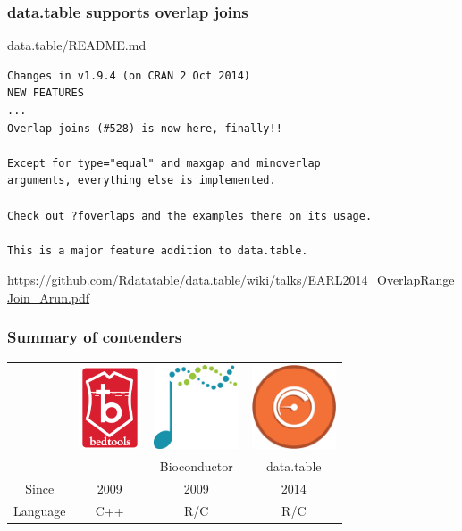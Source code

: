 \documentclass{beamer}
\begin{document}
\begin{frame}[fragile]
  \frametitle{data.table supports overlap joins}

data.table/README.md

\begin{verbatim}
Changes in v1.9.4 (on CRAN 2 Oct 2014)
NEW FEATURES
...
Overlap joins (#528) is now here, finally!! 

Except for type="equal" and maxgap and minoverlap 
arguments, everything else is implemented. 

Check out ?foverlaps and the examples there on its usage. 

This is a major feature addition to data.table.
\end{verbatim}

\alert{\url{https://github.com/Rdatatable/data.table/wiki/talks/EARL2014_OverlapRangeJoin_Arun.pdf}}

\end{frame}

\begin{frame}
  \frametitle{Summary of contenders}
  
  \begin{tabular}{cccc}
    &
    \includegraphics[height=2.5cm]{bedtools} &
    \includegraphics[height=2.5cm]{bioconductor} &
    \includegraphics[height=2.5cm]{datatable} \\
    &  & Bioconductor & data.table \\
    \hline
    Since & 2009 & 2009 & 2014 \\
    Language & C++ & R/C & R/C \\
  \end{tabular}
\end{frame}
\end{document}
